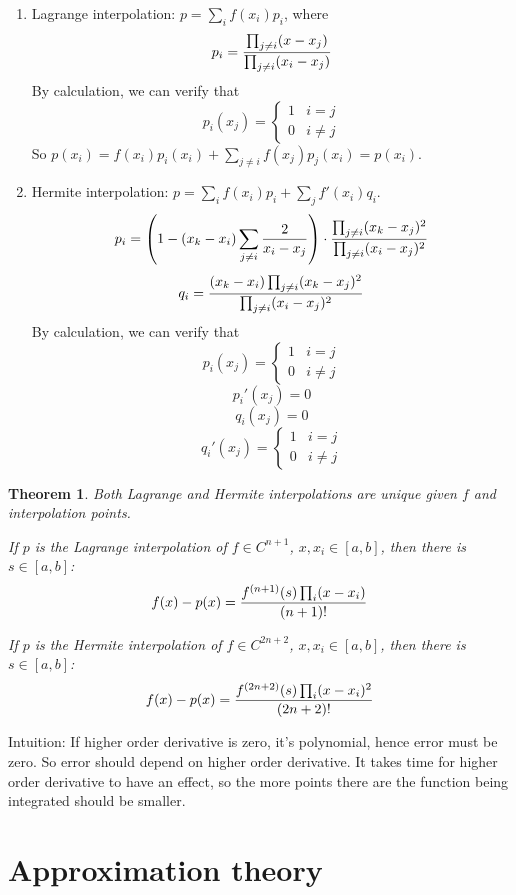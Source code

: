 \documentclass[20pt]{article} %
\theoremstyle{break}
\newtheorem{thm}[definition]{Theorem}
\begin{document}
\begin{enumerate}
\item Lagrange interpolation: $p=\sum_if(x_i)p_i$, where
  \[p_i={\prod_{j\not=i}(x-x_j)\over \prod_{j\not=i}(x_i-x_j)}\]
  By calculation, we can verify that
  \[p_i(x_j)=\begin{cases}1 & i=j\\0 & i\not=j\end{cases}\]
  So $p(x_i)=f(x_i)p_i(x_i)+\sum_{j\not=i}f(x_j)p_j(x_i)=p(x_i)$.
\item Hermite interpolation: $p=\sum_if(x_i)p_i+\sum_jf'(x_i)q_i$.
  \[p_i=\left(1-(x_k-x_i)\sum_{j\not=i}{2\over x_i-x_j}\right)\cdot {\prod_{j\not=i}(x_k-x_j)^2\over \prod_{j\not=i}(x_i-x_j)^2}\]
  \[q_i={(x_k-x_i)\prod_{j\not=i}(x_k-x_j)^2\over \prod_{j\not=i}(x_i-x_j)^2}\]
  By calculation, we can verify that
  \[p_i(x_j)=\begin{cases}1 & i=j\\0 & i\not=j\end{cases}\]
  \[p_i'(x_j)=0\]
  \[q_i(x_j)=0\]
  \[q_i'(x_j)=\begin{cases}1 & i=j\\0 & i\not=j\end{cases}\]
\end{enumerate}

\newpage

\begin{thm}
\item Both Lagrange and Hermite interpolations are unique given $f$ and interpolation points.
\item If $p$ is the Lagrange interpolation of $f\in C^{n+1}$, $x, x_i\in [a, b]$, then there is $s\in [a, b]$:
  \[f(x)-p(x)={f^{(n+1)}(s)\prod_i(x-x_i)\over (n+1)!}\]
\item If $p$ is the Hermite interpolation of $f\in C^{2n+2}$, $x, x_i\in [a, b]$, then there is $s\in [a, b]$:
  \[f(x)-p(x)={f^{(2n+2)}(s)\prod_i(x-x_i)^2\over (2n+2)!}\]  
\end{thm}

Intuition: If higher order derivative is zero, it's polynomial, hence error must be zero. So error should depend on higher order derivative. It takes time for higher order derivative to have an effect, so the more points there are the function being integrated should be smaller.

\newpage

\section{Approximation theory}
\end{document}
